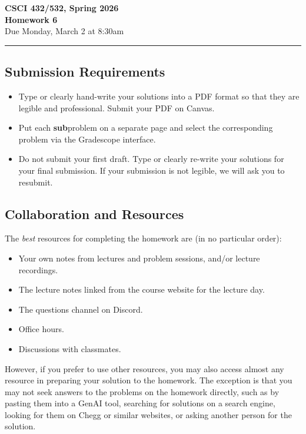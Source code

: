 \documentclass[11pt]{article}
\begin{document}
\begin{center}
\Large\textbf{CSCI 432/532, Spring 2026}%
\\
\LARGE\textbf{Homework 6}%
\\[0.5ex]
\large Due Monday, March 2  at 8:30am
\end{center}

\bigskip
\hrule
\bigskip

\subsection*{Submission Requirements}
\begin{itemize}
    \item Type or clearly hand-write your solutions into a PDF format so that they are legible and professional. Submit your PDF on Canvas. 
	\item Put each \textbf{sub}problem on a separate page and select the corresponding problem via the Gradescope interface.
    \item Do not submit your first draft. Type or clearly re-write your solutions for your final submission. If your submission is not legible, we will ask you to resubmit.
\end{itemize}

\subsection*{Collaboration and Resources}

The \emph{best} resources for completing the homework are (in no particular order):
\begin{itemize}
	\item Your own notes from lectures and problem sessions, and/or lecture recordings.
	\item The lecture notes linked from the course website for the lecture day.
	\item The questions channel on Discord.
	\item Office hours.
	\item Discussions with classmates.
\end{itemize}
However, if you prefer to use other resources,
you may also access almost any resource in preparing your solution to the
homework. The exception is that you may not seek answers to the problems on the
homework directly, such as by pasting them into a GenAI tool, searching for
solutions on a search engine, looking for them on Chegg or similar websites, or
asking another person for the solution.
\end{document}
